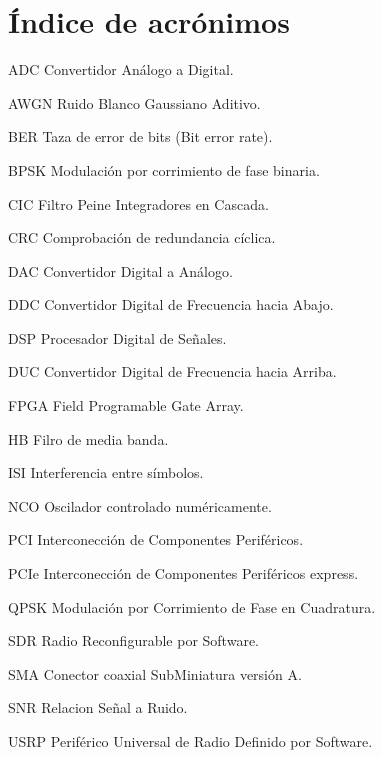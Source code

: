 \chapter*{\'Indice de acr\'onimos}
%

\begin{symbollist*}

\item[ADC]  Convertidor An\'alogo a Digital.
\item[AWGN] Ruido Blanco Gaussiano Aditivo.
\item[BER]  Taza de error de bits (Bit error rate).
\item[BPSK] Modulaci\'on por corrimiento de fase binaria.
\item[CIC]  Filtro Peine Integradores en Cascada.
\item[CRC]  Comprobaci\'on de redundancia c\'iclica.
\item[DAC]  Convertidor Digital a An\'alogo.
\item[DDC]  Convertidor Digital de Frecuencia hacia Abajo.
\item[DSP]  Procesador Digital de Se\~nales.
\item[DUC]  Convertidor Digital de Frecuencia hacia Arriba.
\item[FPGA] Field Programable Gate Array.
\item[HB]   Filro de media banda.
\item[ISI]  Interferencia entre s\'imbolos.
\item[NCO]  Oscilador controlado num\'ericamente.
\item[PCI]  Interconecci\'on de Componentes Perif\'ericos.
\item[PCIe] Interconecci\'on de Componentes Perif\'ericos express.
\item[QPSK] Modulaci\'on por Corrimiento de Fase en Cuadratura.
\item[SDR]  Radio Reconfigurable por Software.
\item[SMA]  Conector coaxial SubMiniatura versi\'on A.
\item[SNR]  Relacion Se\~nal a Ruido.
\item[USRP] Perif\'erico Universal de Radio Definido por Software.

\end{symbollist*}